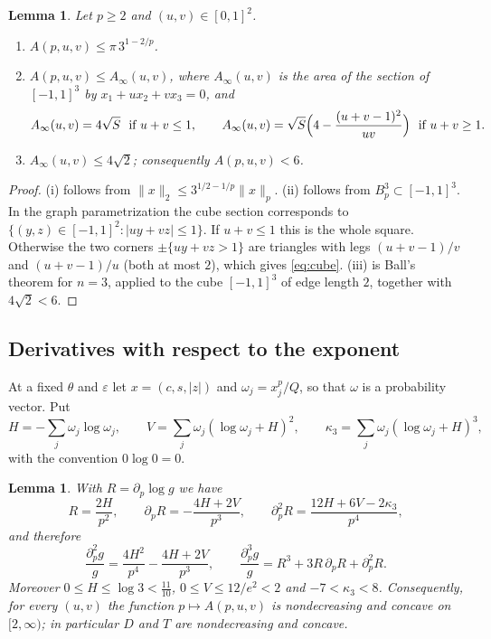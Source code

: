 \documentclass[11pt]{amsart}
\newtheorem{lemma}[theorem]{Lemma}
\theoremstyle{definition}
\theoremstyle{remark}
\numberwithin{equation}{section}
\newcommand{\ve}{\varepsilon}
\begin{document}
\begin{lemma}\label{lem:comparison}
Let $p\ge 2$ and $(u,v)\in[0,1]^2$.
\begin{enumerate}[label=\textup{(\roman*)}]
\item $A(p,u,v)\le \pi\,3^{1-2/p}$.
\item $A(p,u,v)\le A_\infty(u,v)$, where $A_\infty(u,v)$ is the area of the section of $[-1,1]^3$ by $x_1+ux_2+vx_3=0$, and
\begin{equation}\label{eq:cube}
A_\infty(u,v)=4\sqrt S\ \ \text{if } u+v\le1,\qquad A_\infty(u,v)=\sqrt S\Bigl(4-\frac{(u+v-1)^2}{uv}\Bigr)\ \ \text{if } u+v\ge1.
\end{equation}
\item $A_\infty(u,v)\le 4\sqrt2$; consequently $A(p,u,v)<6$.
\end{enumerate}
\end{lemma}

\begin{proof}
(i) follows from $\|x\|_2\le 3^{1/2-1/p}\|x\|_p$. (ii) follows from $B_p^3\subset[-1,1]^3$. In the graph parametrization the cube section corresponds to $\{(y,z)\in[-1,1]^2:|uy+vz|\le1\}$. If $u+v\le1$ this is the whole square. Otherwise the two corners $\pm\{uy+vz>1\}$ are triangles with legs $(u+v-1)/v$ and $(u+v-1)/u$ (both at most $2$), which gives \eqref{eq:cube}. (iii) is Ball's theorem \cite{Ball} for $n=3$, applied to the cube $[-1,1]^3$ of edge length $2$, together with $4\sqrt2<6$.
\end{proof}

\subsection{Derivatives with respect to the exponent}

At a fixed $\theta$ and $\ve$ let $x=(c,s,|z|)$ and $\omega_j=x_j^p/Q$, so that $\omega$ is a probability vector. Put
\[
H=-\sum_j\omega_j\log\omega_j,\qquad V=\sum_j\omega_j(\log\omega_j+H)^2,\qquad \kappa_3=\sum_j\omega_j(\log\omega_j+H)^3,
\]
with the convention $0\log0=0$.

\begin{lemma}\label{lem:pderiv}
With $R=\partial_p\log g$ we have
\begin{equation}\label{eq:pderiv}
R=\frac{2H}{p^2},\qquad \partial_pR=-\frac{4H+2V}{p^3},\qquad \partial_p^2R=\frac{12H+6V-2\kappa_3}{p^4},
\end{equation}
and therefore
\begin{equation}\label{eq:gpp}
\frac{\partial_p^2g}{g}=\frac{4H^2}{p^4}-\frac{4H+2V}{p^3},\qquad \frac{\partial_p^3g}{g}=R^3+3R\,\partial_pR+\partial_p^2R .
\end{equation}
Moreover $0\le H\le\log3<\tfrac{11}{10}$, $0\le V\le 12/e^2<2$ and $-7<\kappa_3<8$. Consequently, for every $(u,v)$ the function $p\mapsto A(p,u,v)$ is nondecreasing and concave on $[2,\infty)$; in particular $D$ and $T$ are nondecreasing and concave.
\end{lemma}
\end{document}
